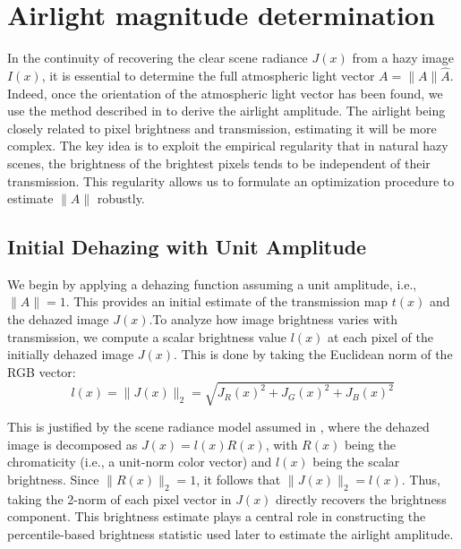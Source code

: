 \documentclass[conference]{IEEEtran}
\begin{document}
\section{Airlight magnitude determination}
In the continuity of recovering the clear scene radiance \( J(x) \) from a hazy image \( I(x) \), it is essential to determine the full atmospheric light vector \( A = \|A\|\hat{A} \). 
Indeed, once the orientation of the atmospheric light vector has been found, we use the method described in \cite{airlight} to derive the airlight amplitude. The airlight being closely related to pixel brightness and transmission, estimating it will be more complex. The key idea is to exploit the empirical regularity that in natural hazy scenes, the brightness of the brightest pixels tends to be independent of their transmission. This regularity allows us to formulate an optimization procedure to estimate \( \|A\| \) robustly.

\subsection{Initial Dehazing with Unit Amplitude}

We begin by applying a dehazing function assuming a unit amplitude, i.e., \( \|A\| = 1 \). This provides an initial estimate of the transmission map \( t(x) \) and the dehazed image \( J(x) \).To analyze how image brightness varies with transmission, we compute a scalar brightness value \( l(x) \) at each pixel of the initially dehazed image \( J(x) \). This is done by taking the Euclidean norm of the RGB vector:
\begin{equation}
\label{initial_brightness }
l(x) = \|J(x)\|_2 = \sqrt{J_R(x)^2 + J_G(x)^2 + J_B(x)^2}
\end{equation}

This is justified by the scene radiance model assumed in \cite{airlight}, where the dehazed image is decomposed as \( J(x) = l(x) R(x) \), with \( R(x) \) being the chromaticity (i.e., a unit-norm color vector) and \( l(x) \) being the scalar brightness. Since \( \|R(x)\|_2 = 1 \), it follows that \( \|J(x)\|_2 = l(x) \). Thus, taking the 2-norm of each pixel vector in \( J(x) \) directly recovers the brightness component. This brightness estimate plays a central role in constructing the percentile-based brightness statistic used later to estimate the airlight amplitude.
\end{document}
